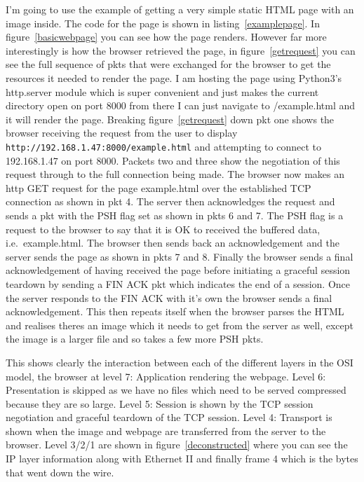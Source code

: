 \documentclass[titlepage]{article}
\begin{document}
I'm going to use the example of getting a very simple static HTML page with an image inside. The 
code for the page is shown in listing~\ref{examplepage}. In figure~\ref{basicwebpage} you can see 
how the page renders. However far more interestingly is how the browser retrieved the page, in 
figure~\ref{getrequest} you can see the full sequence of \glspl{pkt} that were exchanged for the 
browser to get the resources it needed to render the page. I am hosting the page using Python3's 
http.server module which is super convenient and just makes the current directory open on port 8000 
from there I can just navigate to /example.html and it will render the page. Breaking 
figure~\ref{getrequest} down \gls{pkt} one shows the browser receiving the request from the user to 
display \verb|http://192.168.1.47:8000/example.html| and attempting to connect to 192.168.1.47 on 
port 8000. Packets two and three show the negotiation of this request through to the full connection 
being made. The browser now makes an \gls{http} GET request for the page example.html over the 
established TCP connection as shown in \gls{pkt} 4. The server then acknowledges the request and 
sends a \gls{pkt} with the PSH flag set as shown in \glspl{pkt} 6 and 7. The PSH flag is a request 
to the browser to say that it is OK to received the buffered data, i.e.\ example.html. The browser 
then sends back an acknowledgement and the server sends the page as shown in \glspl{pkt} 7 and 8. 
Finally the browser sends a final acknowledgement of having received the page before initiating a 
graceful session teardown by sending a FIN ACK \gls{pkt} which indicates the end of a session. Once 
the server responds to the FIN ACK with it's own the browser sends a final acknowledgement. This 
then repeats itself when the browser parses the HTML and realises theres an image which it needs to 
get from the server as well, except the image is a larger file and so takes a few more PSH 
\glspl{pkt}.

This shows clearly the interaction between each of the different layers in the OSI model,
the browser at level 7: Application rendering the webpage. Level 6: Presentation is skipped as
we have no files which need to be served compressed because they are so large. Level 5: Session
is shown by the TCP session negotiation and graceful teardown of the TCP session. Level 4: Transport
is shown when the image and webpage are transferred from the server to the browser. Level 3/2/1
are shown in figure~\ref{deconstructed} where you can see the IP layer information along with
Ethernet II and finally frame 4 which is the bytes that went down the wire.
\end{document}
